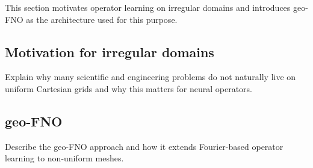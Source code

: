 This section motivates operator learning on irregular domains and
introduces geo-FNO as the architecture used for this purpose.

\subsection{Motivation for irregular domains}

Explain why many scientific and engineering problems do not naturally
live on uniform Cartesian grids and why this matters for neural
operators.

\subsection{geo-FNO}

Describe the geo-FNO approach and how it extends Fourier-based operator
learning to non-uniform meshes.

